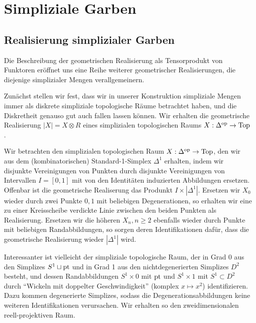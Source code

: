 
\chapter{Simpliziale Garben}
\label{ch:simp-sheaves}

\section{Realisierung simplizialer Garben}
\label{sec:simp-sheaves-real}

Die Beschreibung der geometrischen Realisierung als Tensorprodukt von
Funktoren eröffnet uns eine Reihe weiterer geometrischer
Realisierungen, die diejenige simplizialer Mengen verallgemeinern.

Zunächst stellen wir fest, dass wir in unserer Konstruktion
simpliziale Mengen immer als diskrete simpliziale topologische Räume
betrachtet haben, und die Diskretheit genauso gut auch fallen lassen
können. Wir erhalten die geometrische Realisierung $|X| = X \otimes R$
eines simplizialen topologischen Raums $X: \Delta^\mathrm{op} \to \operatorname{Top}$.
\begin{bsp}
  Wir betrachten den simplizialen topologischen Raum $X: \Delta^\mathrm{op} \to
  \operatorname{Top}$, den wir aus dem (kombinatorischen) Standard-1-Simplex
  $\Delta^1$ erhalten, indem wir disjunkte Vereinigungen von Punkten
  durch disjunkte Vereinigungen von Intervallen $I = [0, 1]$ mit von
  den Identitäten induzierten Abbildungen ersetzen. Offenbar ist die
  geometrische Realiserung das Produnkt $I \times
  |\Delta^1|$. Ersetzen wir $X_0$ wieder durch zwei Punkte ${0, 1}$
  mit beliebigen Degenerationen, so erhalten wir eine zu einer
  Kreisscheibe verdickte Linie zwischen den beiden Punkten als
  Realisierung. Ersetzen wir die höheren $X_n, n \geq 2$ ebenfalls
  wieder durch Punkte mit beliebigen Randabbildungen, so sorgen deren
  Identifikationen dafür, dass die geometrische Realisierung wieder
  $|\Delta^1|$ wird.

  Interessanter ist vielleicht der simpliziale topologische Raum, der
  in Grad 0 aus den Simplizes $S^1 \sqcup \operatorname{pt}$ und in Grad 1 aus
  den nichtdegenerierten Simplizes $D^2$ besteht, und dessen
  Randabbildungen $S^1 \times {0}$ mit $\operatorname{pt}$ und $S^1 \times {1}$
  mit $S^1 \subset D^2$ durch ``Wickeln mit doppelter
  Geschwindigkeit'' (komplex $x \mapsto x^2$) identifizieren. Dazu
  kommen degenerierte Simplizes, sodass die Degenerationsabbildungen
  keine weiteren Identifikationen verursachen. Wir erhalten so den
  zweidimensionalen reell-projektiven Raum.
\end{bsp}

